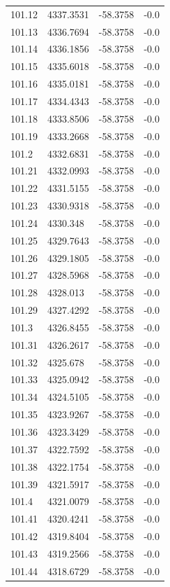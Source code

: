 \begin{table}[H]
\begin{tabular}{llll}
101.12 & 4337.3531 & -58.3758 & -0.0 \\
101.13 & 4336.7694 & -58.3758 & -0.0 \\
101.14 & 4336.1856 & -58.3758 & -0.0 \\
101.15 & 4335.6018 & -58.3758 & -0.0 \\
101.16 & 4335.0181 & -58.3758 & -0.0 \\
101.17 & 4334.4343 & -58.3758 & -0.0 \\
101.18 & 4333.8506 & -58.3758 & -0.0 \\
101.19 & 4333.2668 & -58.3758 & -0.0 \\
101.2 & 4332.6831 & -58.3758 & -0.0 \\
101.21 & 4332.0993 & -58.3758 & -0.0 \\
101.22 & 4331.5155 & -58.3758 & -0.0 \\
101.23 & 4330.9318 & -58.3758 & -0.0 \\
101.24 & 4330.348 & -58.3758 & -0.0 \\
101.25 & 4329.7643 & -58.3758 & -0.0 \\
101.26 & 4329.1805 & -58.3758 & -0.0 \\
101.27 & 4328.5968 & -58.3758 & -0.0 \\
101.28 & 4328.013 & -58.3758 & -0.0 \\
101.29 & 4327.4292 & -58.3758 & -0.0 \\
101.3 & 4326.8455 & -58.3758 & -0.0 \\
101.31 & 4326.2617 & -58.3758 & -0.0 \\
101.32 & 4325.678 & -58.3758 & -0.0 \\
101.33 & 4325.0942 & -58.3758 & -0.0 \\
101.34 & 4324.5105 & -58.3758 & -0.0 \\
101.35 & 4323.9267 & -58.3758 & -0.0 \\
101.36 & 4323.3429 & -58.3758 & -0.0 \\
101.37 & 4322.7592 & -58.3758 & -0.0 \\
101.38 & 4322.1754 & -58.3758 & -0.0 \\
101.39 & 4321.5917 & -58.3758 & -0.0 \\
101.4 & 4321.0079 & -58.3758 & -0.0 \\
101.41 & 4320.4241 & -58.3758 & -0.0 \\
101.42 & 4319.8404 & -58.3758 & -0.0 \\
101.43 & 4319.2566 & -58.3758 & -0.0 \\
101.44 & 4318.6729 & -58.3758 & -0.0 \\

\end{tabular}
\end{table}
